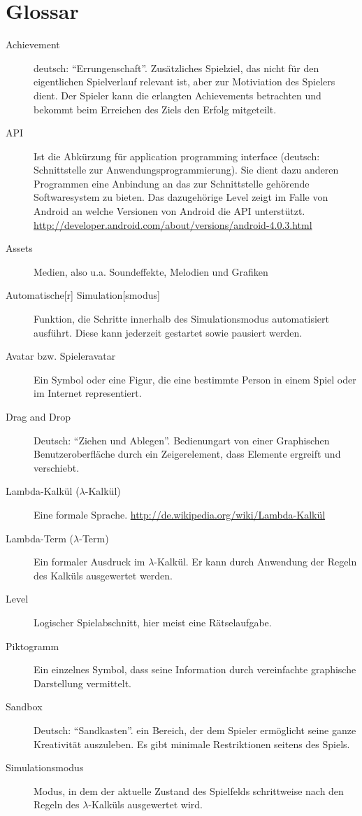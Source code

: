 \section{Glossar}
\begin{description}
	\item[Achievement] deutsch: ``Errungenschaft''. Zusätzliches Spielziel, das nicht für den eigentlichen Spielverlauf relevant ist, aber zur Motiviation des Spielers dient.
		Der Spieler kann die erlangten Achievements betrachten und bekommt beim Erreichen des Ziels den Erfolg mitgeteilt.
	\item[API] Ist die Abkürzung für application programming interface (deutsch: Schnittstelle zur Anwendungsprogrammierung). Sie dient dazu anderen Programmen eine Anbindung an das zur Schnittstelle gehörende Softwaresystem zu bieten. Das dazugehörige Level zeigt im Falle von Android an welche Versionen von Android die API unterstützt. \url{http://developer.android.com/about/versions/android-4.0.3.html}
	\item[Assets] Medien, also u.a. Soundeffekte, Melodien und Grafiken
	\item[Automatische{[}r{]} Simulation{[}smodus{]}] Funktion, die Schritte innerhalb des Simulationsmodus automatisiert ausführt. Diese kann jederzeit gestartet sowie pausiert werden.
	\item [Avatar bzw. Spieleravatar] Ein Symbol oder eine Figur, die eine bestimmte Person in einem Spiel oder im Internet representiert.
	\item [Drag and Drop] Deutsch: ``Ziehen und Ablegen''. Bedienungart von  einer Graphischen Benutzeroberfläche durch ein Zeigerelement, dass Elemente ergreift und verschiebt.
	\item[Lambda-Kalkül (\(\lambda\)-Kalkül)] Eine formale Sprache. \url{http://de.wikipedia.org/wiki/Lambda-Kalkül}
	\item[Lambda-Term (\(\lambda\)-Term)] Ein formaler Ausdruck im \(\lambda\)-Kalkül.
		Er kann durch Anwendung der Regeln des Kalküls ausgewertet werden.
	\item[Level] Logischer Spielabschnitt, hier meist eine Rätselaufgabe.
	\item [Piktogramm] Ein einzelnes Symbol, dass seine Information durch vereinfachte graphische Darstellung vermittelt.
	\item [Sandbox] Deutsch: ``Sandkasten''. ein Bereich, der dem Spieler ermöglicht seine ganze Kreativität auszuleben. Es gibt minimale Restriktionen seitens des Spiels.
	\item[Simulationsmodus] Modus, in dem der aktuelle Zustand des Spielfelds schrittweise nach den Regeln des \(\lambda\)-Kalküls ausgewertet wird.

\end{description}
